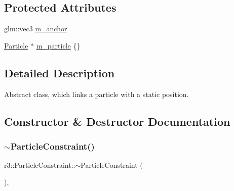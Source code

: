 \subsection*{Protected Attributes}
\begin{DoxyCompactItemize}
\item 
glm\+::vec3 \mbox{\hyperlink{classr3_1_1_particle_constraint_a71ad1de9d86203dbd27059107dc40a9b}{m\+\_\+anchor}}
\item 
\mbox{\hyperlink{classr3_1_1_particle}{Particle}} $\ast$ \mbox{\hyperlink{classr3_1_1_particle_constraint_ad6a80699b1e0579c4a307f3a7ac49d26}{m\+\_\+particle}} \{\}
\end{DoxyCompactItemize}


\subsection{Detailed Description}
Abstract class, which links a particle with a static position. 

\subsection{Constructor \& Destructor Documentation}
\mbox{\label{classr3_1_1_particle_constraint_aa4c9c88384c10a9e9613bdad843df524}} 
\subsubsection{\texorpdfstring{$\sim$\+Particle\+Constraint()}{~ParticleConstraint()}}
{\footnotesize\ttfamily r3\+::\+Particle\+Constraint\+::$\sim$\+Particle\+Constraint (\begin{DoxyParamCaption}{ }\end{DoxyParamCaption})\hspace{0.3cm}{\ttfamily [virtual]}, {\ttfamily [default]}}

\mbox{\label{classr3_1_1_particle_constraint_af158845ecce7f53246f6120ad9dbd4b8}} 
